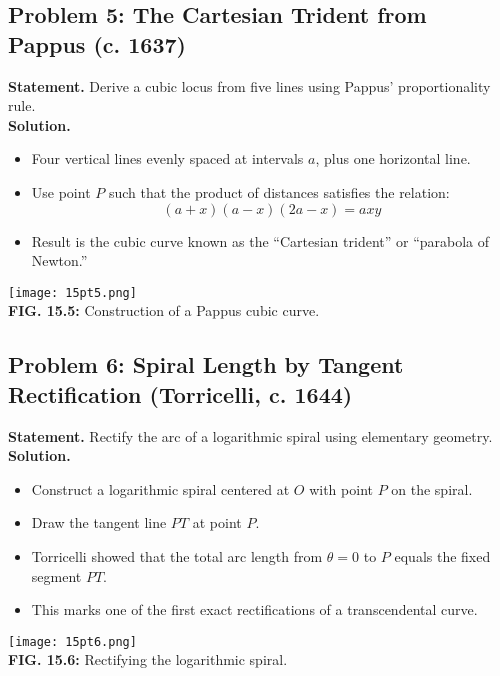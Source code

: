 \documentclass[9pt]{article}
\begin{document}
\subsection*{Problem 5: The Cartesian Trident from Pappus (c. 1637)}
\textbf{Statement.} Derive a cubic locus from five lines using Pappus’ proportionality rule. \\
\textbf{Solution.}
\begin{itemize}
  \item Four vertical lines evenly spaced at intervals \( a \), plus one horizontal line.
  \item Use point \( P \) such that the product of distances satisfies the relation:
  \[
    (a + x)(a - x)(2a - x) = axy
  \]
  \item Result is the cubic curve known as the “Cartesian trident” or “parabola of Newton.”
\end{itemize}
\begin{center}
\texttt{[image: 15pt5.png]} \\
\textbf{FIG. 15.5:} Construction of a Pappus cubic curve.
\end{center}

\newpage

\subsection*{Problem 6: Spiral Length by Tangent Rectification (Torricelli, c. 1644)}
\textbf{Statement.} Rectify the arc of a logarithmic spiral using elementary geometry. \\
\textbf{Solution.}
\begin{itemize}
  \item Construct a logarithmic spiral centered at \( O \) with point \( P \) on the spiral.
  \item Draw the tangent line \( PT \) at point \( P \).
  \item Torricelli showed that the total arc length from \( \theta = 0 \) to \( P \) equals the fixed segment \( PT \).
  \item This marks one of the first exact rectifications of a transcendental curve.
\end{itemize}
\begin{center}
\texttt{[image: 15pt6.png]} \\
\textbf{FIG. 15.6:} Rectifying the logarithmic spiral.
\end{center}

\newpage
\end{document}
